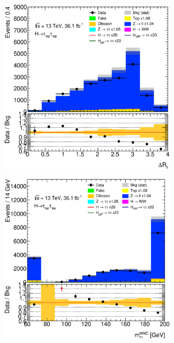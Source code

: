 \begin{figure}[htb]
    \centering
    \begin{subfigure}[t]{0.3\textwidth}
        \includegraphics[width=\textwidth]{./plots/mva/modeling/input_vars/BOOST_CR/ll-CutMVABoostedCatZllCR-DeltaRLL-lin.eps}
    \end{subfigure}
    \begin{subfigure}[t]{0.3\textwidth}
        \includegraphics[width=\textwidth]{./plots/mva/modeling/input_vars/BOOST_CR/ll-CutMVABoostedCatZllCR-dilep_mmc_mlm_m_ub-lin.eps}

\end{subfigure}
\end{figure}
